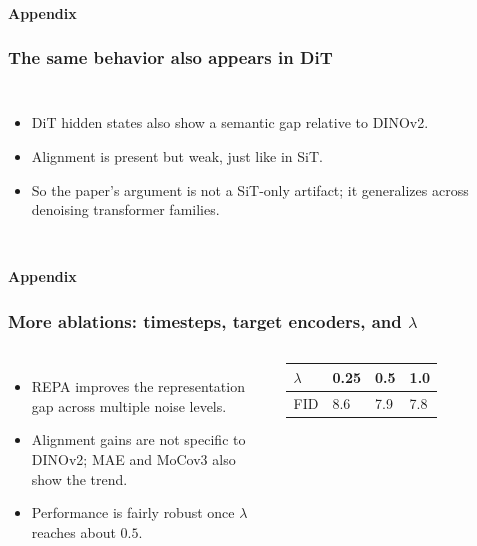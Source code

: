 \begin{frame}[t]
  \framesubtitle{Appendix}
  \frametitle{The same behavior also appears in DiT}
  \begin{columns}[T,totalwidth=\textwidth]
    \FigTen[width=\linewidth]
    \begin{itemize}
      \item DiT hidden states also show a semantic gap relative to DINOv2.
      \item Alignment is present but weak, just like in SiT.
      \item So the paper's argument is not a SiT-only artifact; it generalizes across denoising transformer families.
    \end{itemize}
  \end{columns}
\end{frame}

\begin{frame}[t]
  \framesubtitle{Appendix}
  \frametitle{More ablations: timesteps, target encoders, and \(\lambda\)}
  \begin{columns}[T,totalwidth=\textwidth]
    \begin{itemize}
      \item REPA improves the representation gap across multiple noise levels.
      \item Alignment gains are not specific to DINOv2; MAE and MoCov3 also show the trend.
      \item Performance is fairly robust once \(\lambda\) reaches about \(0.5\).
    \end{itemize}
    \vspace{0.14cm}
    \begin{tabular}{C{1.0cm}C{1.0cm}C{1.0cm}C{1.0cm}}
      \toprule
      \(\lambda\) & 0.25 & 0.5 & 1.0 \\
      \midrule
      FID & 8.6 & 7.9 & 7.8 \\
      \bottomrule
    \end{tabular}
  \end{columns}
\end{frame}

